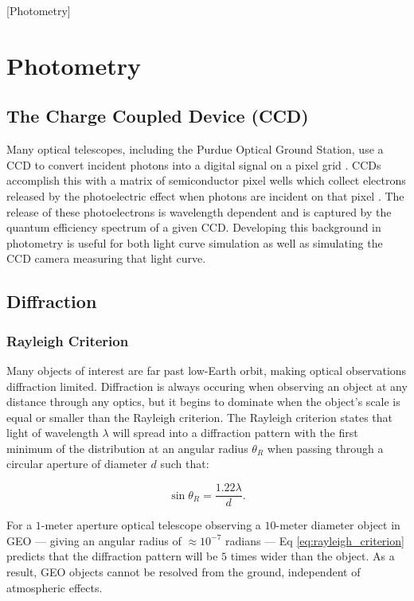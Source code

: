 [Photometry]
\graphicspath{{/Users/liamrobinson/Documents/PyLightCurves/docs/build/html/_images}}

\section{Photometry}

\subsection{The Charge Coupled Device (CCD)}

Many optical telescopes, including the Purdue Optical Ground Station, use a CCD to convert incident photons into a digital signal on a pixel grid \cite{krag2003}. CCDs accomplish this with a matrix of semiconductor pixel wells which collect electrons released by the photoelectric effect when photons are incident on that pixel \cite{krag2003}. The release of these photoelectrons is wavelength dependent and is captured by the quantum efficiency spectrum of a given CCD. Developing this background in photometry is useful for both light curve simulation as well as simulating the CCD camera measuring that light curve. 

\subsection{Diffraction}

\subsubsection{Rayleigh Criterion}

Many objects of interest are far past low-Earth orbit, making optical observations diffraction limited. Diffraction is always occuring when observing an object at any distance through any optics, but it begins to dominate when the object's scale is equal or smaller than the Rayleigh criterion. The Rayleigh criterion states that light of wavelength $\lambda$ will spread into a diffraction pattern with the first minimum of the distribution at an angular radius $\theta_R$ when passing through a circular aperture of diameter $d$ such that:

\begin{equation} \label{eq:rayleigh_criterion}
  \sin\theta_R = \frac{1.22 \lambda}{d}.
\end{equation}

For a $1$-meter aperture optical telescope observing a $10$-meter diameter object in GEO --- giving an angular radius of $\approx 10^{-7}$ radians --- Eq \ref{eq:rayleigh_criterion} predicts that the diffraction pattern will be $5$ times wider than the object. As a result, GEO objects cannot be resolved from the ground, independent of atmospheric effects. 

